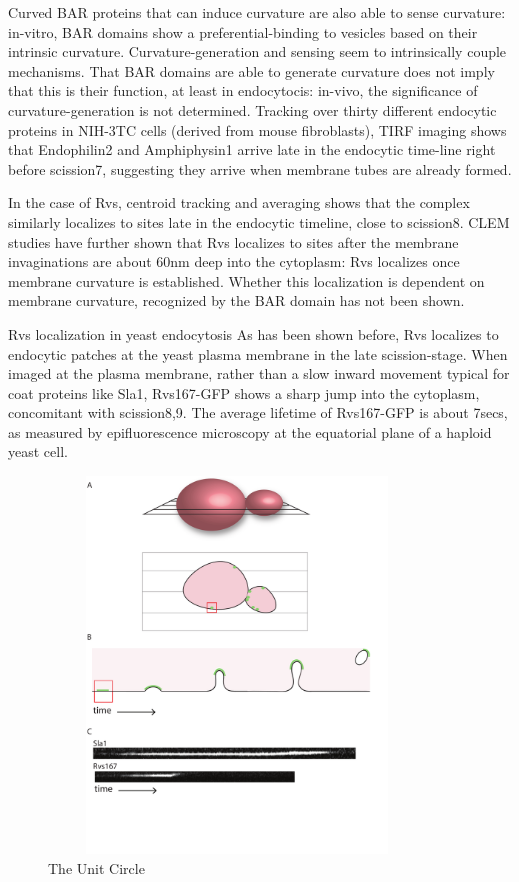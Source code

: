 \vspace{5mm}
Curved BAR proteins that can induce curvature are also able to sense curvature: in-vitro, BAR domains show a preferential-binding to vesicles based on their intrinsic curvature. Curvature-generation and sensing seem to intrinsically couple mechanisms. That BAR domains are able to generate curvature does not imply that this is their function, at least in endocytocis: in-vivo, the significance of curvature-generation is not determined. Tracking over thirty different endocytic proteins in NIH-3TC cells (derived from mouse fibroblasts), TIRF imaging shows that Endophilin2 and Amphiphysin1 arrive late in the endocytic time-line right before scission7, suggesting they arrive when membrane tubes are already formed. 

\vspace{5mm}
In the case of Rvs, centroid tracking and averaging shows that the complex similarly localizes to sites late in the endocytic timeline, close to scission8. CLEM studies have further shown that Rvs localizes to sites after the membrane invaginations are about 60nm deep into the cytoplasm: Rvs localizes once membrane curvature is established. Whether this localization is dependent on membrane curvature, recognized by the BAR domain has not been shown. 

\vspace{5mm}
Rvs localization in yeast endocytosis
As has been shown before, Rvs localizes to endocytic patches at the yeast plasma membrane in the late scission-stage. When imaged at the plasma membrane, rather than a slow inward movement typical for coat proteins like Sla1, Rvs167-GFP shows a sharp jump into the cytoplasm, concomitant with scission8,9. The average lifetime of Rvs167-GFP is about 7secs, as measured by epifluorescence microscopy at the equatorial plane of a haploid yeast cell. 

\begin{figure}
\centering
\includegraphics[width=10cm,height=10cm,keepaspectratio]{figures/results_final/yeast_schemat_fig1_C}
\caption{The Unit Circle \label{fig1_schematic}}
\end{figure}

